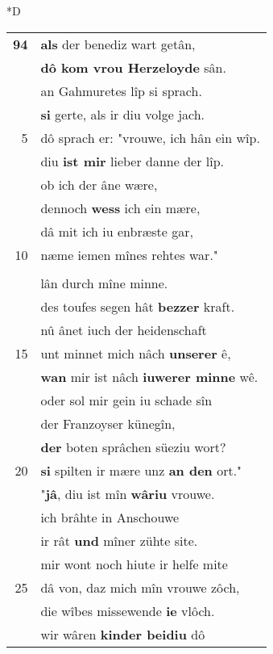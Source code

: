 \documentclass[8pt,a4paper,notitlepage]{article}
\begin{document}
\begin{table}[ht]
\begin{minipage}[t]{0.5\linewidth}
\small
\begin{center}*D
\end{center}
\begin{tabular}{rl}
\textbf{94} & \textbf{als} der benediz wart getân,\\ 
 & \textbf{dô kom vrou Herzeloyde} sân.\\ 
 & an Gahmuretes lîp si sprach.\\ 
 & \textbf{si} gerte, als ir diu volge jach.\\ 
5 & dô sprach er: "vrouwe, ich hân ein wîp.\\ 
 & diu \textbf{ist mir} lieber danne der lîp.\\ 
 & ob ich der âne wære,\\ 
 & dennoch \textbf{wess} ich ein mære,\\ 
 & dâ mit ich iu enbræste gar,\\ 
10 & næme iemen mînes rehtes war."\\ 
 & \textbf{\begin{large}S\end{large}i sprach}: "ir sult die mœrinne\\ 
 & lân durch mîne minne.\\ 
 & des toufes segen hât \textbf{bezzer} kraft.\\ 
 & nû ânet iuch der heidenschaft\\ 
15 & unt minnet mich nâch \textbf{unserer} ê,\\ 
 & \textbf{wan} mir ist nâch \textbf{iuwerer minne} wê.\\ 
 & oder sol mir gein iu schade sîn\\ 
 & der Franzoyser künegîn,\\ 
 & \textbf{der} boten sprâchen süeziu wort?\\ 
20 & \textbf{si} spilten ir mære unz \textbf{an den} ort."\\ 
 & "\textbf{jâ}, diu ist mîn \textbf{wâriu} vrouwe.\\ 
 & ich brâhte in Anschouwe\\ 
 & ir rât \textbf{und} mîner zühte site.\\ 
 & mir wont noch hiute ir helfe mite\\ 
25 & dâ von, daz mich mîn vrouwe zôch,\\ 
 & die wîbes missewende \textbf{ie} vlôch.\\ 
 & wir wâren \textbf{kinder beidiu} dô\\ 

\end{tabular}
\end{minipage}
\end{table}
\end{document}
